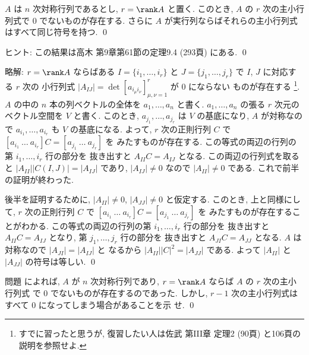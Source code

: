 \documentclass[12pt,twoside]{jarticle}
\begin{document}

\begin{question}
\label{q:takagi-theorem9.4}
  $A$ は $n$ 次対称行列であるとし, $r=\rank A$ と置く.
  このとき, $A$ の $r$ 次の主小行列式で $0$ でないものが存在する.
  さらに $A$ が実行列ならばそれらの主小行列式はすべて同じ符号を持つ.
  \qed
\end{question}

\noindent
ヒント: この結果は高木 \cite{takagi1} 第9章第61節の定理9.4 (293頁) にある.  
\qed

\medskip
\noindent
略解: 
$r = \rank A$ ならばある $I=\{i_1,\dots,i_r\}$ と $J=\{j_1,\dots,j_r\}$ 
で $I$, $J$ に対応する $r$ 次の
小行列式 $|A_{IJ}| = \det [a_{i_\mu i_\nu}]_{\mu,\nu=1}^r$ が $0$ にならない
ものが存在する%
\footnote{すでに習ったと思うが, 復習したい人は佐武 \cite{satake} 第III章
  定理2 (90頁) と106頁の説明を参照せよ.}.  
$A$ の中の $n$ 本の列ベクトルの全体を $a_1,\dots,a_n$ と書く.  
$a_1,\dots,a_n$ の張る $r$ 次元のベクトル空間を $V$ と書く.
このとき, $a_{j_1},\dots,a_{j_r}$ は $V$ の基底になり, 
$A$ が対称なので $a_{i_1},\dots,a_{i_r}$ も $V$ の基底になる.  
よって, $r$ 次の正則行列 $C$ 
で $[a_{i_1}\ \dots\ a_{i_r}]C = [a_{j_1}\ \dots\ a_{j_r}]$ を
みたすものが存在する. この等式の両辺の行列の第 $i_1,\dots,i_r$ 行の部分を
抜き出すと $A_{II}C=A_{IJ}$ となる. 
この両辺の行列式を取ると $|A_{II}||C(I,J)|=|A_{IJ}|$ 
であり, $|A_{IJ}|\ne 0$ なので $|A_{II}|\ne 0$ である.
これで前半の証明が終わった.

後半を証明するために, $|A_{II}|\ne 0$, $|A_{JJ}|\ne 0$ と仮定する.
このとき, 上と同様にして, $r$ 次の正則行列 $C$ 
で $[a_{i_1}\ \dots\ a_{i_r}]C = [a_{j_1}\ \dots\ a_{j_r}]$ を
みたすものが存在することがわかる.  
この等式の両辺の行列の第 $i_1,\dots,i_r$ 行の部分を
抜き出すと $A_{II}C=A_{IJ}$ となり, 第 $j_1,\dots,j_r$ 行の部分を
抜き出すと $A_{JI}C=A_{JJ}$ となる. 
$A$ は対称なので $|A_{JI}|=|A_{IJ}|$ と
なるから $|A_{II}||C|^2 = |A_{JJ}|$ である.
よって $|A_{II}|$ と $|A_{JJ}|$ の符号は等しい.
\qed


\begin{question}
  問題  によれば, 
  $A$ が $n$ 次対称行列であり, $r=\rank A$ ならば $A$ の $r$ 次の主小行列式
  で $0$ でないものが存在するのであった.
  しかし, $r-1$ 次の主小行列式はすべて $0$ になってしまう場合があることを示
  せ.
  \qed
\end{question}
\end{document}
